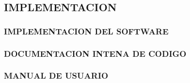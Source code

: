 \subsection{IMPLEMENTACION}
\subsubsection{IMPLEMENTACION DEL SOFTWARE}
\subsubsection{DOCUMENTACION INTENA DE CODIGO}
\subsubsection{MANUAL DE USUARIO}
